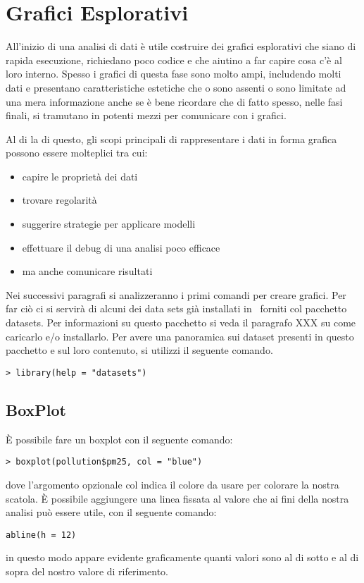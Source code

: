 \section{Grafici Esplorativi}

All'inizio di una analisi di dati è utile costruire dei grafici esplorativi che siano di rapida esecuzione, richiedano poco codice e che aiutino a far capire cosa c'è al loro interno. Spesso i grafici di questa fase sono molto ampi, includendo molti dati e presentano caratteristiche estetiche che o sono assenti o sono limitate ad una mera informazione anche se è bene ricordare che di fatto spesso, nelle fasi finali, si tramutano in potenti mezzi per comunicare con i grafici.

Al di la di questo, gli scopi principali di rappresentare i dati in forma grafica possono essere molteplici tra cui:
\begin{itemize}
\item capire le proprietà dei dati
\item trovare regolarità
\item suggerire strategie per applicare modelli
\item effettuare il debug di una analisi poco efficace
\item ma anche comunicare risultati
\end{itemize}

Nei successivi paragrafi si analizzeranno i primi comandi per creare grafici. Per far ciò ci si servirà di alcuni dei data sets già installati in \erre\ forniti col pacchetto \textsf{datasets}. Per informazioni su questo pacchetto si veda il paragrafo XXX su come caricarlo e/o installarlo. Per avere una panoramica sui dataset presenti in questo pacchetto e sul loro contenuto, si utilizzi il seguente comando.
\begin{lstlisting}
> library(help = "datasets")
\end{lstlisting}

\subsection{BoxPlot}
È possibile fare un boxplot con il seguente comando:
\begin{lstlisting}
> boxplot(pollution$pm25, col = "blue") 
\end{lstlisting}
dove l'argomento opzionale \textsf{col} indica il colore da usare per colorare la nostra scatola.
È possibile  aggiungere una linea fissata al valore che ai fini della nostra analisi può essere utile, con il seguente comando:
\begin{lstlisting}
abline(h = 12)
\end{lstlisting}
in questo modo appare evidente graficamente quanti valori sono al di sotto e al di sopra del nostro valore di riferimento.

